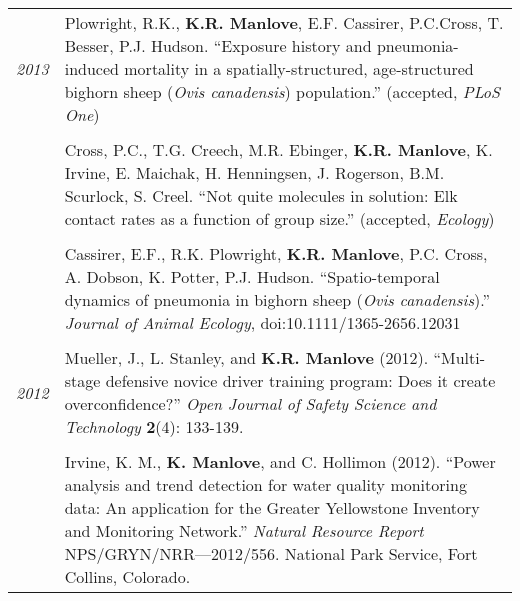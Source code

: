 \documentclass[9pt]{article}
\begin{document}
\begin{tabular}{p{.5cm} p{15cm}}
\hspace{-1.75cm} \footnotesize{\textit{2013}} & \hspace{-.5cm} Plowright, R.K.,\textbf{ K.R. Manlove}, E.F. Cassirer, P.C.Cross, T. Besser, P.J. Hudson. 
  ``Exposure history and pneumonia-induced mortality in a spatially-structured, age-structured bighorn sheep (\textit{Ovis canadensis}) population.'' (accepted, \textit{PLoS One}) \\ 
  \\
  & \hspace{-.5cm} Cross, P.C., T.G. Creech, M.R. Ebinger, \textbf{K.R. Manlove}, K. Irvine, E. Maichak, H. Henningsen, J. Rogerson, B.M. Scurlock, S. Creel.  ``Not quite molecules in solution: Elk contact rates as a function of group size.''  (accepted, \textit{Ecology}) \\
  \\
  & \hspace{-.5cm} Cassirer, E.F., R.K. Plowright, \textbf{K.R. Manlove}, P.C. Cross, A. Dobson, K. Potter, P.J. Hudson.  ``Spatio-temporal dynamics of pneumonia in bighorn sheep (\textit{Ovis canadensis}).'' \textit{Journal of Animal Ecology}, doi:10.1111/1365-2656.12031 \\
  \\
\hspace{-1.75cm}  \footnotesize{\textit{2012}} & \hspace{-.5cm} Mueller, J., L. Stanley, and \textbf{ K.R. Manlove} (2012). ``Multi-stage defensive novice driver training program: Does it create overconfidence?''  \textit{Open Journal of Safety Science and Technology} \textbf{2}(4): 133-139. \\
  \\ 
  & \hspace{-.5cm} Irvine, K. M., \textbf{K. Manlove}, and C. Hollimon (2012). ``Power analysis and trend detection for water quality monitoring data: An application for the Greater Yellowstone Inventory and Monitoring Network.'' \textit{Natural Resource Report} NPS/GRYN/NRR—2012/556. National Park Service, Fort Collins, Colorado. \\
  \end{tabular}
  
\end{document}
